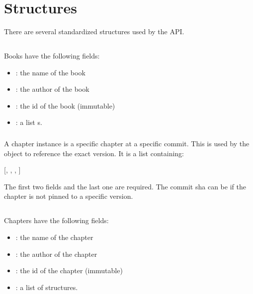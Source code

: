 \documentclass[onecolumn, draftclsnofoot, 10pt, compsoc]{IEEEtran}
\begin{document}
\section{Structures}%

\noindent There are several standardized structures used by the API.%

\subsection{}\label{sec-book}%

\noindent Books have the following fields:%

\begin{itemize}[noitemsep,topsep=\mdcompacttopsep]%

\item{}: the name of the book%

\item{}: the author of the book%

\item{}: the id of the book (immutable)%

\item{}: a list s.%
\end{itemize}%

\subsubsection{}\label{sec-chapter_instance}%

\noindent A chapter instance is a specific chapter at a specific commit. This is used
by the  object to reference the exact version. It is a list containing:%

[, , , ]%

The first two fields and the last one are required. The commit sha can be 
if the chapter is not pinned to a specific version.%

\subsection{}\label{sec-chapter}%

\noindent Chapters have the following fields:%

\begin{itemize}[noitemsep,topsep=\mdcompacttopsep]%

\item{}: the name of the chapter%

\item{}: the author of the chapter%

\item{}: the id of the chapter (immutable)%

\item{}: a list of  structures.%
\end{itemize}%
\end{document}
